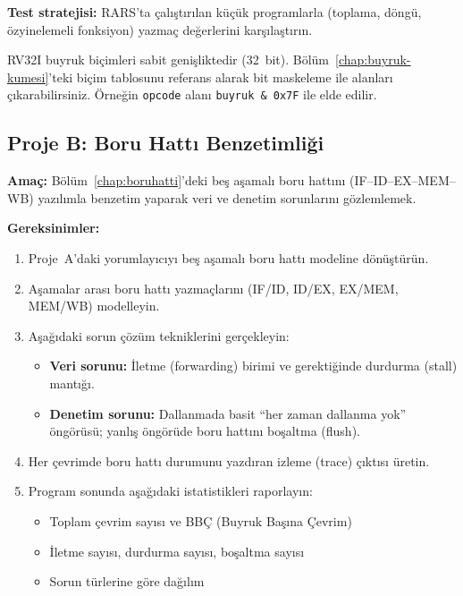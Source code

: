 \textbf{Test stratejisi:} RARS'ta çalıştırılan küçük programlarla (toplama, döngü, özyinelemeli fonksiyon) yazmaç değerlerini karşılaştırın.

\begin{bilginot}
RV32I buyruk biçimleri sabit genişliktedir (32~bit). Bölüm~\ref{chap:buyruk-kumesi}'teki biçim tablosunu referans alarak bit maskeleme ile alanları çıkarabilirsiniz. Örneğin \texttt{opcode} alanı \texttt{buyruk \& 0x7F} ile elde edilir.
\end{bilginot}


\subsection{Proje B: Boru Hattı Benzetimliği}
\label{sec:ekd-proje-b}

\textbf{Amaç:} Bölüm~\ref{chap:boruhatti}'deki beş aşamalı boru hattını (IF--ID--EX--MEM--WB) yazılımla benzetim yaparak veri ve denetim sorunlarını gözlemlemek.\smallskip

\textbf{Gereksinimler:}
\begin{enumerate}[leftmargin=2em]
    \item Proje~A'daki yorumlayıcıyı beş aşamalı boru hattı modeline dönüştürün.
    \item Aşamalar arası boru hattı yazmaçlarını (IF/ID, ID/EX, EX/MEM, MEM/WB) modelleyin.
    \item Aşağıdaki sorun çözüm tekniklerini gerçekleyin:
    \begin{itemize}[leftmargin=1.5em]
        \item \textbf{Veri sorunu:} İletme (forwarding) birimi ve gerektiğinde durdurma (stall) mantığı.
        \item \textbf{Denetim sorunu:} Dallanmada basit ``her zaman dallanma yok'' öngörüsü; yanlış öngörüde boru hattını boşaltma (flush).
    \end{itemize}
    \item Her çevrimde boru hattı durumunu yazdıran izleme (trace) çıktısı üretin.
    \item Program sonunda aşağıdaki istatistikleri raporlayın:
    \begin{itemize}[leftmargin=1.5em]
        \item Toplam çevrim sayısı ve BBÇ (Buyruk Başına Çevrim)
        \item İletme sayısı, durdurma sayısı, boşaltma sayısı
        \item Sorun türlerine göre dağılım
    \end{itemize}
\end{enumerate}

